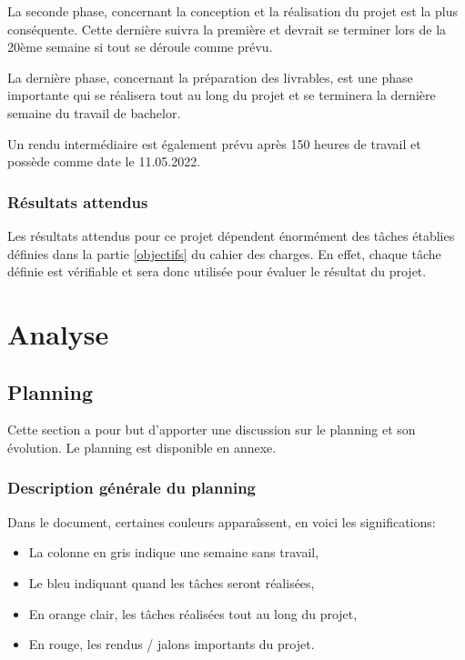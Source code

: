\documentclass[
    iai, %
    il, %
]{heig-tb}
\begin{document}
La seconde phase, concernant la conception et la réalisation du projet est la plus conséquente.
Cette dernière suivra la première et devrait se terminer lors de la 20ème semaine si tout se déroule comme prévu.

La dernière phase, concernant la préparation des livrables, est une phase importante qui se réalisera tout au long du projet et se terminera la dernière semaine du travail de bachelor.

Un rendu intermédiaire est également prévu après 150 heures de travail et possède comme date le 11.05.2022.

\subsection{Résultats attendus}

Les résultats attendus pour ce projet dépendent énormément des tâches établies définies dans la partie \ref{objectifs} du cahier des charges.\newline
En effet, chaque tâche définie est vérifiable et sera donc utilisée pour évaluer le résultat du projet.
\newpage

\chapter{Analyse}

\section{Planning}
Cette section a pour but d'apporter une discussion sur le planning et son évolution.
Le planning est disponible en annexe.

\subsection{Description générale du planning}

Dans le document, certaines couleurs apparaîssent, en voici les significations:
\begin{itemize}
    \item La colonne en gris indique une semaine sans travail,
    \item Le bleu indiquant quand les tâches seront réalisées,
    \item En orange clair, les tâches réalisées tout au long du projet,
    \item En rouge, les rendus / jalons importants du projet.
\end{itemize}
\end{document}
